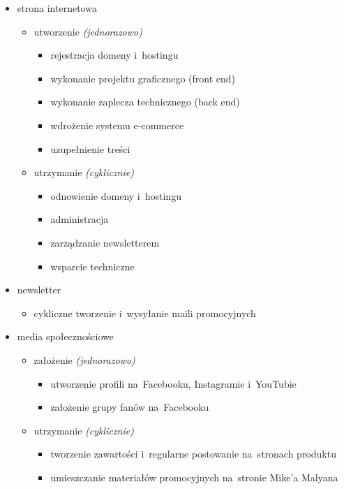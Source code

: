 \documentclass[12pt]{article}
\begin{document}
\begin{itemize}
    \item strona internetowa \begin{itemize}
        \item utworzenie \textit{(jednorazowo)} \begin{itemize}
            \item rejestracja domeny i~hostingu
            \item wykonanie projektu graficznego (front end)
            \item wykonanie zaplecza technicznego (back end)
            \item wdrożenie systemu e-commerce
            \item uzupełnienie treści \end{itemize}
        \item utrzymanie \textit{(cyklicznie)} \begin{itemize}
            \item odnowienie domeny i~hostingu
            \item administracja
            \item zarządzanie newsletterem
            \item wsparcie techniczne \end{itemize} \end{itemize}
    \item newsletter \begin{itemize}
        \item cykliczne tworzenie i~wysyłanie maili promocyjnych \end{itemize}
    \item media społecznościowe \begin{itemize}
        \item założenie \textit{(jednorazowo)} \begin{itemize}
            \item utworzenie profili na~Facebooku, Instagramie i~YouTubie
            \item założenie grupy fanów na~Facebooku \end{itemize}
        \item utrzymanie \textit{(cyklicznie)} \begin{itemize}
            \item tworzenie zawartości i~regularne postowanie na~stronach produktu
            \item umieszczanie materiałów promocyjnych na~stronie Mike'a Malyana

\end{itemize}
\end{itemize}
\end{itemize}
\end{document}

